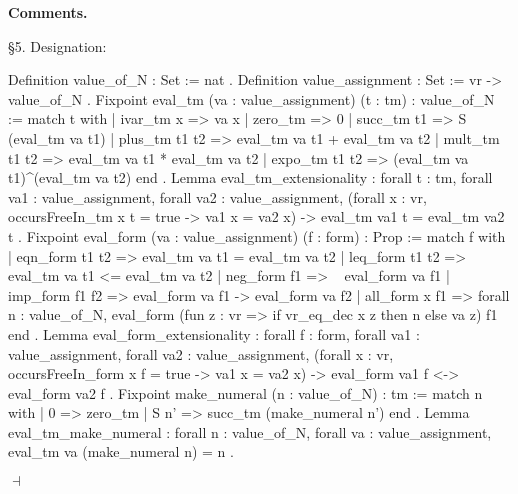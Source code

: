 \documentclass[12pt]{paper}
\newenvironment{context}[1][]
{ \noindent \textbf{{#1}.}
}
{ \hfill $ \dashv $
}
\begin{document}
\begin{context}[Comments]
    \S5. Designation:
    \begin{coqcode}
Definition value_of_N : Set :=
  nat
.
Definition value_assignment : Set :=
  vr -> value_of_N
.
Fixpoint eval_tm (va : value_assignment) (t : tm) : value_of_N :=
  match t with
  | ivar_tm x => va x
  | zero_tm => 0
  | succ_tm t1 => S (eval_tm va t1)
  | plus_tm t1 t2 => eval_tm va t1 + eval_tm va t2
  | mult_tm t1 t2 => eval_tm va t1 * eval_tm va t2
  | expo_tm t1 t2 => (eval_tm va t1)^(eval_tm va t2)
  end
.
Lemma eval_tm_extensionality :
  forall t : tm,
  forall va1 : value_assignment,
  forall va2 : value_assignment,
  (forall x : vr, occursFreeIn_tm x t = true -> va1 x = va2 x) ->
  eval_tm va1 t = eval_tm va2 t
.
Fixpoint eval_form (va : value_assignment) (f : form) : Prop :=
  match f with
  | eqn_form t1 t2 => eval_tm va t1 = eval_tm va t2
  | leq_form t1 t2 => eval_tm va t1 <= eval_tm va t2
  | neg_form f1 => ~ eval_form va f1
  | imp_form f1 f2 => eval_form va f1 -> eval_form va f2
  | all_form x f1 => forall n : value_of_N, eval_form (fun z : vr => if vr_eq_dec x z then n else va z) f1
  end
.
Lemma eval_form_extensionality :
  forall f : form,
  forall va1 : value_assignment,
  forall va2 : value_assignment,
  (forall x : vr, occursFreeIn_form x f = true -> va1 x = va2 x) ->
  eval_form va1 f <-> eval_form va2 f
.
Fixpoint make_numeral (n : value_of_N) : tm :=
  match n with
  | 0 => zero_tm
  | S n' => succ_tm (make_numeral n')
  end
.
Lemma eval_tm_make_numeral :
  forall n : value_of_N,
  forall va : value_assignment,
  eval_tm va (make_numeral n) = n
.
    \end{coqcode}


\end{context}
\end{document}
